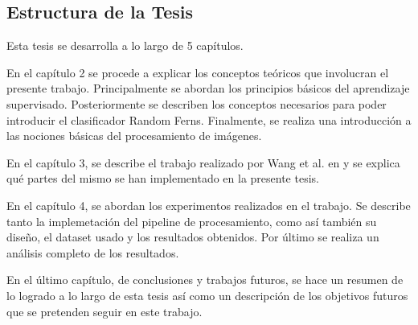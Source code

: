 \subsection{Estructura de la Tesis}

	Esta tesis se desarrolla a lo largo de 5 capítulos.	
		
	En el capítulo 2 se procede a explicar los conceptos teóricos que involucran el presente trabajo. Principalmente se abordan los principios básicos del aprendizaje supervisado. Posteriormente se describen los conceptos ne\-ce\-sa\-rios para poder introducir  el clasificador Random Ferns. Finalmente, se rea\-li\-za una introducción a las nociones básicas del procesamiento de imágenes.
	
	 En el capítulo 3, se describe el trabajo realizado por Wang et al. en \cite{wang} y se explica qué partes del mismo se han implementado en la presente tesis.

	En el capítulo 4, se abordan los experimentos realizados en el trabajo. Se describe tanto la implemetación del pipeline de procesamiento, como así también su diseño, el dataset usado y los resultados obtenidos. Por último se realiza un análisis completo de los resultados.
	
	En el último capítulo, de conclusiones y trabajos futuros, se hace un resumen de lo logrado a lo largo de esta tesis así como un descripción de los objetivos futuros que se pretenden seguir en este trabajo.
